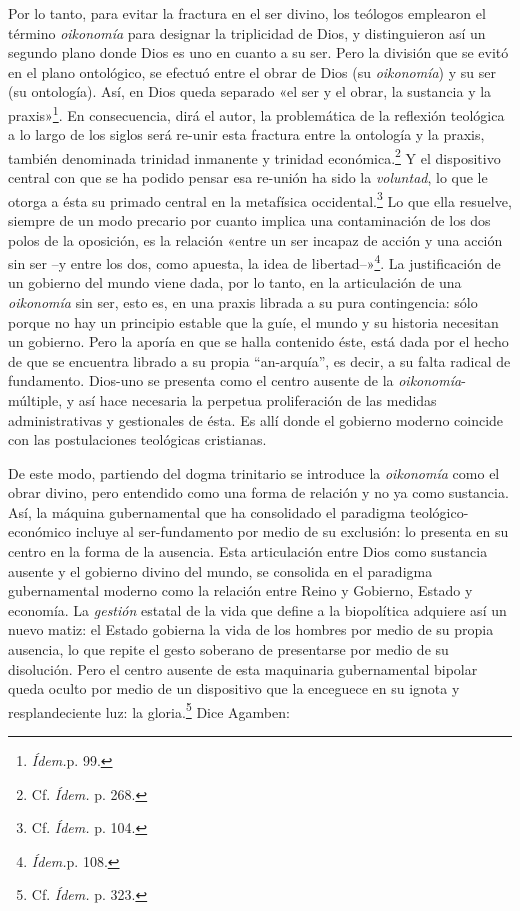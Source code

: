 Por lo tanto, para evitar la fractura en el ser divino, los teólogos emplearon el término \emph{oikonomía} para designar la triplicidad de Dios, y distinguieron así un segundo plano donde Dios es uno en cuanto a su ser. Pero la división que se evitó en el plano ontológico, se efectuó entre el obrar de Dios (su \emph{oikonomía}) y su ser (su ontología). Así, en Dios queda separado «el ser y el obrar, la sustancia y la praxis»\footnote{\emph{Ídem.}p. 99.}. En consecuencia, dirá el autor, la problemática de la reflexión teológica a lo largo de los siglos será re-unir esta fractura entre la ontología y la praxis, también denominada trinidad inmanente y trinidad económica.\footnote{Cf. \emph{Ídem.} p. 268.} Y el dispositivo central con que se ha podido pensar esa re-unión ha sido la \emph{voluntad}, lo que le otorga a ésta su primado central en la metafísica occidental.\footnote{Cf. \emph{Ídem.} p. 104.} Lo que ella resuelve, siempre de un modo precario por cuanto implica una contaminación de los dos polos de la oposición, es la relación «entre un ser incapaz de acción y una acción sin ser --y entre los dos, como apuesta, la idea de libertad--»\footnote{\emph{Ídem.}p. 108.}. La justificación de un gobierno del mundo viene dada, por lo tanto, en la articulación de una \emph{oikonomía} sin ser, esto es, en una praxis librada a su pura contingencia: sólo porque no hay un principio estable que la guíe, el mundo y su historia necesitan un gobierno. Pero la aporía en que se halla contenido éste, está dada por el hecho de que se encuentra librado a su propia ``an-arquía'', es decir, a su falta radical de fundamento. Dios-uno se presenta como el centro ausente de la \emph{oikonomía}-múltiple, y así hace necesaria la perpetua proliferación de las medidas administrativas y gestionales de ésta. Es allí donde el gobierno moderno coincide con las postulaciones teológicas cristianas.

De este modo, partiendo del dogma trinitario se introduce la \emph{oikonomía} como el obrar divino, pero entendido como una forma de relación y no ya como sustancia. Así, la máquina gubernamental que ha consolidado el paradigma teológico-económico incluye al ser-fundamento por medio de su exclusión: lo presenta en su centro en la forma de la ausencia. Esta articulación entre Dios como sustancia ausente y el gobierno divino del mundo, se consolida en el paradigma gubernamental moderno como la relación entre Reino y Gobierno, Estado y economía. La \emph{gestión} estatal de la vida que define a la biopolítica adquiere así un nuevo matiz: el Estado gobierna la vida de los hombres por medio de su propia ausencia, lo que repite el gesto soberano de presentarse por medio de su disolución. Pero el centro ausente de esta maquinaria gubernamental bipolar queda oculto por medio de un dispositivo que la enceguece en su ignota y resplandeciente luz: la gloria.\footnote{Cf. \emph{Ídem.} p. 323.} Dice Agamben:

